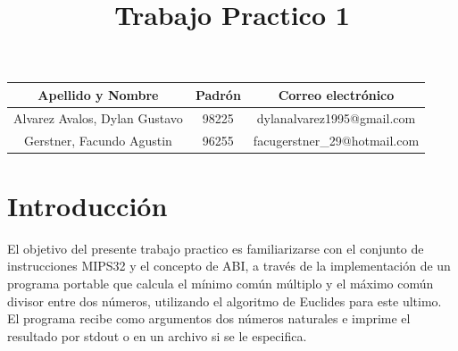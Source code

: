 \documentclass[a4paper,10pt]{article}
\begin{document}
\title{\textbf{Trabajo Practico 1}}

\maketitle

	\begin{table}[h!]
	  \centering
	  \begin{tabular}{ccc}
		\toprule
		Apellido y Nombre & Padrón & Correo electrónico	\\
		\midrule
		Alvarez Avalos, Dylan Gustavo & 98225 & dylanalvarez1995@gmail.com\\
		Gerstner, Facundo Agustin & 96255 & facugerstner\_29@hotmail.com\\
		\bottomrule
	  \end{tabular}
	\end{table}

\date{}
\newpage

\thispagestyle{empty}


\section{Introducción}
  
   El objetivo del presente trabajo practico es familiarizarse con el conjunto de instrucciones MIPS32 y el concepto de ABI, a través de la implementación de un programa portable que calcula el mínimo común múltiplo y el máximo común divisor entre dos números, utilizando el algoritmo de Euclides para este ultimo. El programa recibe como argumentos dos números naturales e imprime el resultado por stdout o en un archivo si se le especifica.
\end{document}
